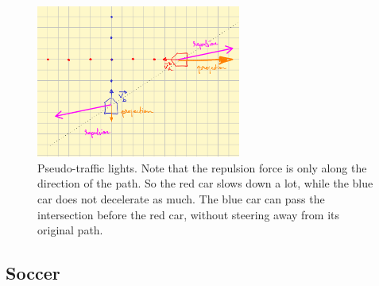 \documentclass[a4paper,12pt]{article}
\begin{document}
\begin{figure}[!hptb]
  \centering
  \includegraphics[width= 0.6\textwidth]{./figures/pseudo_traffic_lights.png}
  \caption{Pseudo-traffic lights. Note that the repulsion force is only along the direction of the path. So the red car slows down a lot, while the blue car does not decelerate as much. The blue car can pass the intersection before the red car, without steering away from its original path.}
  \label{fig:pseudo_traffic_lights}
\end{figure}


\subsection{Soccer}
\end{document}

